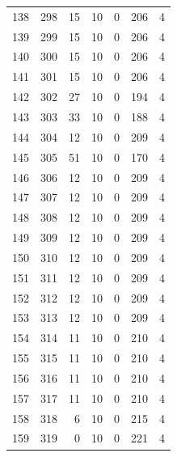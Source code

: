\documentclass[a4paper,twoside,12pt]{book}
\begin{document}
\begin{appendices}
\begin{table}
\begin{tabular}{lrrrrrr}
		138 &    298 &        15 &        10 &               0 &             206 &         4 \\
		139 &    299 &        15 &        10 &               0 &             206 &         4 \\
		140 &    300 &        15 &        10 &               0 &             206 &         4 \\
		141 &    301 &        15 &        10 &               0 &             206 &         4 \\
		142 &    302 &        27 &        10 &               0 &             194 &         4 \\
		143 &    303 &        33 &        10 &               0 &             188 &         4 \\
		144 &    304 &        12 &        10 &               0 &             209 &         4 \\
		145 &    305 &        51 &        10 &               0 &             170 &         4 \\
		146 &    306 &        12 &        10 &               0 &             209 &         4 \\
		147 &    307 &        12 &        10 &               0 &             209 &         4 \\
		148 &    308 &        12 &        10 &               0 &             209 &         4 \\
		149 &    309 &        12 &        10 &               0 &             209 &         4 \\
		150 &    310 &        12 &        10 &               0 &             209 &         4 \\
		151 &    311 &        12 &        10 &               0 &             209 &         4 \\
		152 &    312 &        12 &        10 &               0 &             209 &         4 \\
		153 &    313 &        12 &        10 &               0 &             209 &         4 \\
		154 &    314 &        11 &        10 &               0 &             210 &         4 \\
		155 &    315 &        11 &        10 &               0 &             210 &         4 \\
		156 &    316 &        11 &        10 &               0 &             210 &         4 \\
		157 &    317 &        11 &        10 &               0 &             210 &         4 \\
		158 &    318 &         6 &        10 &               0 &             215 &         4 \\
		159 &    319 &         0 &        10 &               0 &             221 &         4 \\
		\bottomrule
		\end{tabular}				
\end{table}	


\end{appendices}
\end{document}
